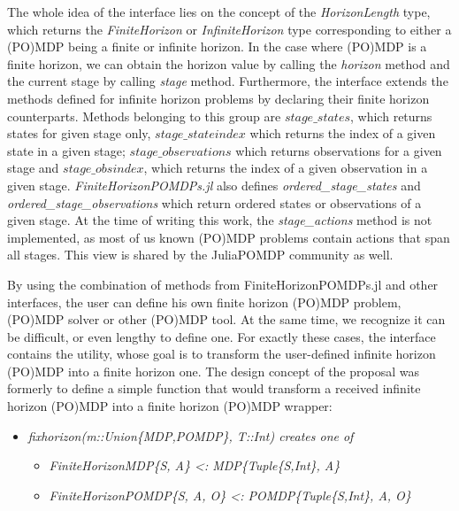 The whole idea of the interface lies on the concept of the \textit{HorizonLength} type, which returns the \textit{FiniteHorizon} or \textit{InfiniteHorizon} type corresponding to either a (PO)MDP being a finite or infinite horizon. In the case where (PO)MDP is a finite horizon, we can obtain the horizon value by calling the \textit{horizon} method and the current stage by calling \textit{stage} method. Furthermore, the interface extends the methods defined for infinite horizon problems by declaring their finite horizon counterparts. Methods belonging to this group are $stage\_states$, which returns states for given stage only, $stage\_stateindex$ which returns the index of a given state in a given stage; $ stage\_observations$ which returns observations for a given stage and $stage\_obsindex$, which returns the index of a given observation in a given stage. \emph{FiniteHorizonPOMDPs.jl} also defines \textit{ordered\_stage\_states} and \textit{ordered\_stage\_observations} which return ordered states or observations of a given stage. At the time of writing this work, the \textit{stage\_actions} method is not implemented, as most of us known (PO)MDP problems contain actions that span all stages. This view is shared by the JuliaPOMDP community as well.

By using the combination of methods from FiniteHorizonPOMDPs.jl and other interfaces, the user can define his own finite horizon (PO)MDP problem, (PO)MDP solver or other (PO)MDP tool. At the same time, we recognize it can be difficult, or even lengthy to define one. For exactly these cases, the interface contains the utility, whose goal is to transform the user-defined infinite horizon (PO)MDP into a finite horizon one.  The design concept of the proposal was formerly to define a simple function that would transform a received infinite horizon (PO)MDP into a finite horizon (PO)MDP wrapper:

\begin{samepage}
\begin{itemize}
    \item \textit{fixhorizon(m::Union\{MDP,POMDP\}, T::Int) creates one of}
    \begin{itemize}
        \item \textit{FiniteHorizonMDP\{S, A\} <: MDP\{Tuple\{S,Int\}, A\}}
        \item \textit{FiniteHorizonPOMDP\{S, A, O\} <: POMDP\{Tuple\{S,Int\}, A, O\}}
    \end{itemize}
\end{itemize}
\end{samepage}

